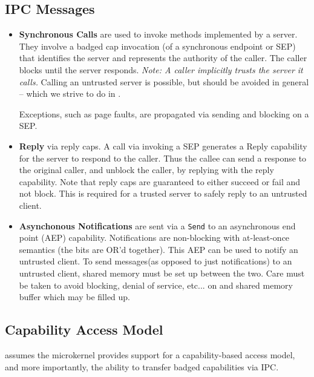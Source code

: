 \subsection{IPC Messages}

\begin{itemize}

	\item 
	\textbf{Synchronous Calls} are used to invoke methods implemented by a
	server. They involve a badged cap invocation (of a synchronous endpoint or
	SEP) that identifies the server and represents the authority of the caller.
	The caller blocks until the server responds. \emph{Note: A caller
	implicitly trusts the server it calls.} Calling an untrusted server is
	possible, but should be avoided in general -- which we strive to do in
	.

	Exceptions, such as page faults, are propagated via sending and blocking on
	a SEP.

	\item 
	\textbf{Reply} via reply caps. A call via invoking a SEP generates a Reply
	capability for the server to respond to the caller. Thus the callee can
	send a response to the original caller, and unblock the caller, by replying
	with the reply capability. Note that reply caps are guaranteed to either
	succeed or fail and not block. This is required for a trusted server to
	safely reply to an untrusted client.

	\item
	\textbf{Asynchonous Notifications} are sent via a \texttt{Send} to an
	asynchronous end point (AEP) capability. Notifications are non-blocking
	with at-least-once semantics (the bits are OR'd together). This AEP can be
	used to notify an untrusted client. To send messages(as opposed to just
	notifications) to an untrusted client, shared memory must be set up between
	the two. Care must be taken to avoid blocking, denial of service, etc... on
	and shared memory buffer which may be filled up.

\end{itemize}

\subsection{Capability Access Model}

 assumes the microkernel provides support for a capability-based access
model, and more importantly, the ability to transfer badged capabilities via
IPC. 

